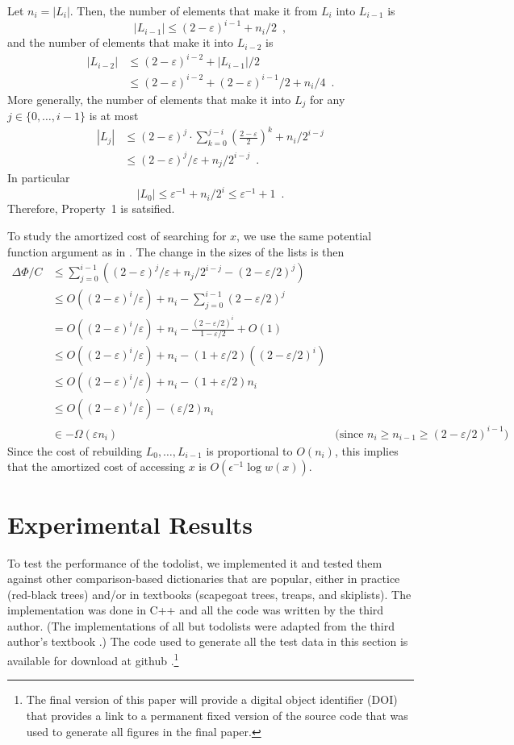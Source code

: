 \documentclass[lotsofwhite]{patmorin}
\newcommand{\eps}{\varepsilon}
\begin{document}
Let $n_i=|L_i|$. Then,
the number of elements that make it from $L_i$ into $L_{i-1}$ is 
\[  |L_{i-1}| \le (2-\eps)^{i-1} + n_i/2 \enspace , \]
and the number of elements that make it into $L_{i-2}$ is
\begin{align*}
   |L_{i-2}| & \le (2-\eps)^{i-2} + |L_{i-1}|/2 \\
     & \le (2-\eps)^{i-2} + (2-\eps)^{i-1}/2 + n_i/4 \enspace . 
\end{align*}
More generally, the number of elements that make it into $L_j$ for any $j\in \{0,\ldots,i-1\}$ is at most
\begin{align*}
    |L_j| & \le (2-\eps)^{j} \cdot \sum_{k=0}^{j-i}\left(\frac{2-\eps}{2}\right)^k  + n_i/2^{i-j} \\
       & \le (2-\eps)^j/\eps + n_j/2^{i-j} \enspace .
\end{align*}
In particular
\[
    |L_0| \le \eps^{-1} + n_i/2^i \le \eps^{-1} + 1\enspace .
\]
Therefore, Property~1 is satsified.

To study the amortized cost of searching for $x$, we use the same
potential function argument as in .  The change in the sizes of the lists is then 
\begin{align*}
  \Delta\Phi/C & \le \sum_{j=0}^{i-1}\left((2-\eps)^j/\eps + n_j/2^{i-j} - (2-\eps/2)^j\right) \\
  & \le O((2-\eps)^i/\eps) + n_i - \sum_{j=0}^{i-1}(2-\eps/2)^j \\
  & = O((2-\eps)^i/\eps) + n_i - \frac{(2-\eps/2)^i}{1-\eps/2} + O(1) \\
  & \le O((2-\eps)^i/\eps) + n_i - (1+\eps/2)((2-\eps/2)^i) \\
  & \le O((2-\eps)^i/\eps) + n_i - (1+\eps/2)n_i \\
  & \le O((2-\eps)^i/\eps) - (\eps/2)n_i \\
  & \in - \Omega(\eps n_i) & \text{(since $n_i \ge n_{i-1} \ge (2-\eps/2)^{i-1}$)}
\end{align*}
Since the cost of rebuilding $L_0,\ldots,L_{i-1}$ is proportional to $O(n_i)$, this implies that the amortized cost of accessing $x$ is $O(\epsilon^{-1}\log w(x))$.


\section{Experimental Results}

To test the performance of the todolist, we implemented it and tested
them against other comparison-based dictionaries that are popular, either
in practice (red-black trees) and/or in textbooks (scapegoat trees,
treaps, and skiplists).  The implementation was done in C++ and all
the code was written by the third author.  (The implementations of all
but todolists were adapted from the third author's textbook \cite{S}.)
The code used to generate all the test data in this section is available
for download at github \cite{}.\footnote{The final version of this paper
will provide a digital object identifier (DOI) that provides a link to
a permanent fixed version of the source code that was used to generate
all figures in the final paper.}
\end{document}
